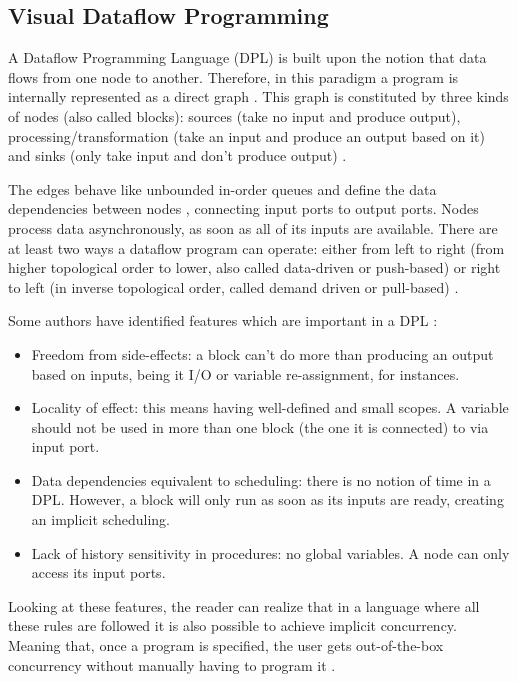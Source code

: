 \begin{itemsize}
\subsection{Visual Dataflow Programming}

A Dataflow Programming Language (DPL) is built upon the notion that data flows
from one node to another. Therefore, in this paradigm a program is internally
represented as a direct graph \cite{Hils1992}. This graph is constituted by
three kinds of nodes (also called blocks): sources (take no input and produce
output), processing/transformation (take an input and produce an output based
on it) and sinks (only take input and don't produce output) \cite{Sousa2012}.

The edges behave like unbounded in-order queues and define the data dependencies
between nodes \cite{Johnston2004}, connecting input ports to output ports. Nodes process data asynchronously, as soon
as all of its inputs are available. There are at least two ways a dataflow program
can operate: either from left to right (from higher topological order to lower,
also called data-driven or push-based) or right to left (in inverse topological order, called
demand driven or pull-based) \cite{Johnston2004}.

Some authors have identified features which are important in a DPL
\cite{ackerman1982data}\cite{wail1995can}:

\begin{itemize}
  \item Freedom from side-effects: a block can't do more than producing an
output based on inputs, being it I/O or variable re-assignment, for instances.
  \item Locality of effect: this means having well-defined and small scopes. A
variable should not be used in more than one block (the one it is connected) to
via input port.
  \item Data dependencies equivalent to scheduling: there is no notion
of time in a DPL. However, a block will only run as soon as its inputs are ready,
creating an implicit scheduling.
  \item Lack of history sensitivity in procedures: no global variables. A node
can only access its input ports.
\end{itemize}

Looking at these features, the reader can realize that in a language where all
these rules are followed it is also possible to achieve implicit concurrency.
Meaning that, once a program is specified, the user gets out-of-the-box concurrency
without manually having to program it \cite{Sousa2012}.


\end{itemsize}
